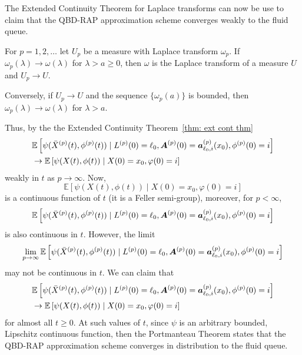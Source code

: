 The Extended Continuity Theorem for Laplace transforms \cite[Chapter XIII, Theorem 2a]{feller1957} can now be use to claim that the QBD-RAP approximation scheme converges weakly to the fluid queue.
\begin{thm}\label{thm: ext cont thm}
	For \(p=1,2,\dots\) let \(U_p\) be a measure with Laplace transform \(\omega_p\). If \(\omega_p(\lambda)\to\omega(\lambda)\) for \(\lambda > a\geq 0\), then \(\omega\) is the Laplace transform of a measure \(U\) and \(U_p\to U\).
	
	Conversely, if \(U_p\to U\) and the sequence \(\{\omega_p(a)\}\) is bounded, then \(\omega_p(\lambda)\to\omega(\lambda)\) for \(\lambda >a\). 
\end{thm}
Thus, by the the Extended Continuity Theorem~\ref{thm: ext cont thm}
\begin{align}
		&\mathbb E\left[\psi(\bar X^{(p)}(t),\phi^{(p)}(t))  \mid L^{(p)}(0)=\ell_0, \boldsymbol A^{(p)}(0)=\boldsymbol  a_{\ell_0,i}^{(p)}(x_0), \phi^{(p)}(0)=i \right] \nonumber
		\\&\to \mathbb E\left[\psi(X(t),\phi(t))\mid X(0)=x_0, \varphi(0)=i \right] \nonumber
\end{align}
weakly in \(t\) as \(p\to \infty\). Now, \[\mathbb E\left[\psi(X(t),\phi(t))\mid X(0)=x_0, \varphi(0)=i \right]\] is a continuous function of \(t\) (it is a Feller semi-group), moreover, for \(p<\infty\), \[\mathbb E\left[\psi(\bar X^{(p)}(t),\phi^{(p)}(t))  \mid L^{(p)}(0)=\ell_0, \boldsymbol A^{(p)}(0)=\boldsymbol  a_{\ell_0,i}^{(p)}(x_0), \phi^{(p)}(0)=i \right] \] is also continuous in \(t\). However, the limit \[\lim\limits_{p\to\infty}\mathbb E\left[\psi(\bar X^{(p)}(t),\phi^{(p)}(t))  \mid L^{(p)}(0)=\ell_0, \boldsymbol A^{(p)}(0)=\boldsymbol  a_{\ell_0,i}^{(p)}(x_0), \phi^{(p)}(0)=i \right] \] may not be continuous in \(t\). We can claim that 
\begin{align}
		&\mathbb E\left[\psi(\bar X^{(p)}(t),\phi^{(p)}(t))  \mid L^{(p)}(0)=\ell_0, \boldsymbol A^{(p)}(0)=\boldsymbol  a_{\ell_0,i}^{(p)}(x_0), \phi^{(p)}(0)=i \right] \nonumber
		\\&\to \mathbb E\left[\psi(X(t),\phi(t))\mid X(0)=x_0, \varphi(0)=i \right] \nonumber
\end{align}
for almost all \(t\geq 0\). At such values of \(t\), since \(\psi\) is an arbitrary bounded, Lipschitz continuous function, then the Portmanteau Theorem states that the QBD-RAP approximation scheme converges in distribution to the fluid queue.

